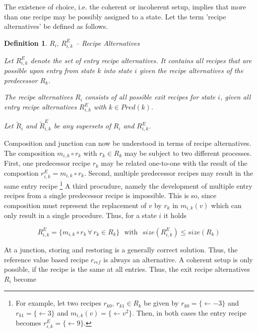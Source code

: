\documentclass[12pt,a4paper]{scrartcl}
\newtheorem{definition}{Definition}
\begin{document}
The existence of choice, i.e. the coherent or incoherent setup, implies that
more than one recipe may be possibly assigned to a state.  Let the term 'recipe
alternatives' be defined as follows.

\begin{definition} $R_i,\,R^E_{i,k}$ -- Recipe Alternatives

    Let $R^E_{i,k}$ denote the set of entry recipe alternatives. It contains
    all recipes that are possible upon entry from state $k$ into state $i$
    given the recipe alternatives of the predecessor $R_k$. 

    The recipe alternatives $R_i$ consists of all possible exit recipes for
    state $i$, given all entry recipe alternatives $R^E_{i,k}$ with $k\in
    Pred(k)$.  

    Let $\tilde{R}_i$ and $\tilde{R}^E_{i,k}$ be any supersets of $R_i$ and
    $R^E_{i,k}$.
    
\end{definition}

Composition and junction can now be understood in terms of recipe alternatives.
The composition $m_{i,k} \circ r_k$ with $r_k\in R_k$ may be subject to two
different processes. First, one predecessor recipe $r_k$ may be related
one-to-one with the result of the compostion $r^E_{i,k} = m_{i,k} \circ r_k$.
Second, multiple predecessor recipes may result in the same entry recipe%
\footnote{For example, let two recipes $r_{k0},\,r_{k1}\in R_k$ be given by
$r_{k0}=\{\leftarrow -3\}$ and $r_{k1}=\{ \leftarrow 3\}$ and $m_{i,k}(v)=\{
\leftarrow v^2 \}$. Then, in both cases the entry recipe becomes $r^E_{i,k}=\{
\leftarrow 9 \}$.}
A third procudure, namely the development of multiple entry
recipes from a single predecessor recipe is impossible. This is so, since
composition must represent the replacement of $v$ by $r_k$ in $m_{i,k}(v)$
which can only result in a single procedure.  Thus, for a state $i$ it holds 

\begin{equation} \label{eq:composition-recipe-alternatives}
    R^E_{i,k} = \{ m_{i,k} \circ r_k \,\forall\,r_k\in R_k \} 
    \,\,\mbox{ with }\,\,
    size(R^E_{i,k}) \le size(R_k) 
\end{equation}

At a junction, storing and restoring is a generally correct solution. Thus, the
reference value based recipe $r_{ref}$ is always an alternative. A coherent
setup is only possible, if the recipe is the same at all entries.  Thus, the
exit recipe alternatives $R_i$ become
\end{document}
